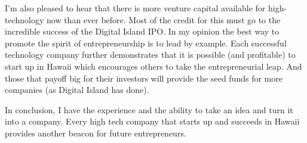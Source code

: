 I'm also pleased to hear that there is more venture capital available for
high-technology now than ever before. Most of the credit for this must go to
the incredible success of the Digital Island IPO. In my opinion the best way to
promote the spirit of entrepreneurship is to lead by example. Each successful
technology company further demonstrates that it is possible (and profitable) to
start up in Hawaii which encourages others to take the entrepreneurial leap.
And those that payoff big for their investors will provide the seed funds for
more companies (as Digital Island has done).

In conclusion, I have the experience and the ability to take an idea and turn
it into a company. Every high tech company that starts up and succeeds in
Hawaii provides another beacon for future entrepreneurs.

